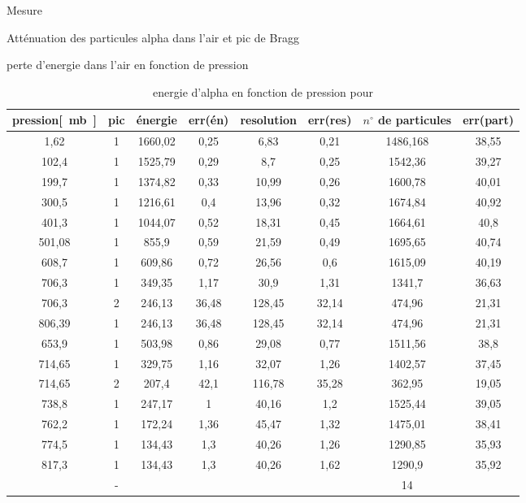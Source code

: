 \documentclass[a4paper,11pt]{scrartcl}
\begin{document}
 \begin{section}{Mesure}
  
 \end{section}
\begin{section}{Atténuation des particules alpha dans l'air et pic de Bragg}
\begin{subsection}{perte d'energie dans l'air en fonction de pression}
\begin{table}[htbp]
\caption{energie d'alpha en fonction de pression pour }
\begin{center}
\begin{tabular}{|c||c|c|c|c|c|c|c|}
\hline 
pression\unit{[mb]} & pic	&	énergie	&	err(én)	&	resolution	&	err(res)	&	$n^{\circ}$ de particules	&	err(part) 	\\ \hline\hline
1,62	&	1	&	1660,02	&	0,25	&	6,83	&	0,21	&	1486,168	&	38,55	\\ \hline
102,4	&	1	&	1525,79	&	0,29	&	8,7	&	0,25	&	1542,36	&	39,27	\\ \hline
199,7	&	1	&	1374,82	&	0,33	&	10,99	&	0,26	&	1600,78	&	40,01	\\ \hline
300,5	&	1	&	1216,61	&	0,4	&	13,96	&	0,32	&	1674,84	&	40,92	\\ \hline
401,3	&	1	&	1044,07	&	0,52	&	18,31	&	0,45	&	1664,61	&	40,8	\\ \hline
501,08	&	1	&	855,9	&	0,59	&	21,59	&	0,49	&	1695,65	&	40,74	\\ \hline
608,7	&	1	&	609,86	&	0,72	&	26,56	&	0,6	&	1615,09	&	40,19	\\ \hline
706,3	&	1	&	349,35	&	1,17	&	30,9	&	1,31	&	1341,7	&	36,63	\\ \hline
706,3	&	2	&	246,13	&	36,48	&	128,45	&	32,14	&	474,96	&	21,31	\\ \hline
806,39	&	1	&	246,13	&	36,48	&	128,45	&	32,14	&	474,96	&	21,31	\\ \hline
653,9	&	1	&	503,98	&	0,86	&	29,08	&	0,77	&	1511,56	&	38,8	\\ \hline
714,65	&	1	&	329,75	&	1,16	&	32,07	&	1,26	&	1402,57	&	37,45	\\ \hline
714,65	&	2	&	207,4	&	42,1	&	116,78	&	35,28	&	362,95	&	19,05	\\ \hline
738,8	&	1	&	247,17	&	1	&	40,16	&	1,2	&	1525,44	&	39,05	\\ \hline
762,2	&	1	&	172,24	&	1,36	&	45,47	&	1,32	&	1475,01	&	38,41	\\ \hline
774,5	&	1	&	134,43	&	1,3	&	40,26	&	1,26	&	1290,85	&	35,93	\\ \hline
817,3	&	1	&	134,43	&	1,3	&	40,26	&	1,62	&	1290,9	&	35,92	\\ \hline
	&	-	&		&		&		&		&	14	&		\\ \hline\hline


\end{tabular}
\end{center}
\end{table}
\end{subsection}
\end{section}
\end{document}
